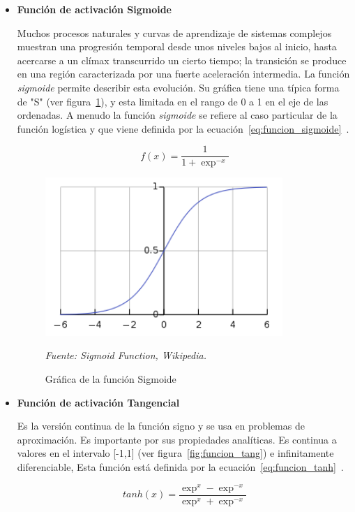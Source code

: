 \begin{itemize}
\item \textbf{Función de activación Sigmoide}

Muchos procesos naturales y curvas de aprendizaje de sistemas complejos muestran una progresión temporal desde unos niveles bajos al inicio, hasta acercarse a un clímax transcurrido un cierto tiempo; la transición se produce en una región caracterizada por una fuerte aceleración intermedia. La función \textit{sigmoide} permite describir esta evolución. Su gráfica tiene una típica forma de "S" (ver figura~\ref{fig:funcion_sigmoid}), y esta limitada en el rango de 0 a 1 en el eje de las ordenadas. A menudo la función \textit{sigmoide} se refiere al caso particular de la función logística y que viene definida por la ecuación~\ref{eq:funcion_sigmoide}~\cite{24fsigmoide}.

\begin{equation}\label{eq:funcion_sigmoide}
f(x) = \frac{1}{1+\exp^{-x}}
\end{equation}

\begin{figure}[H]
		\centering
		\includegraphics[width=90mm]{Imagenes/fSigmoid.png}
		\caption{Gráfica de la función Sigmoide}
		\vspace{0.15cm}
		\textit{Fuente: Sigmoid Function, Wikipedia.}
		\label{fig:funcion_sigmoid}
\end{figure} 

\item \textbf{Función de activación Tangencial}

Es la versión continua de la función signo y se usa en problemas de aproximación. Es importante por sus propiedades analíticas. Es continua a valores en el intervalo [-1,1] (ver figura~\ref{fig:funcion_tang}) e infinitamente diferenciable, Esta función está definida por la ecuación~\ref{eq:funcion_tanh}~\cite{25ftangencial}.

\begin{equation}\label{eq:funcion_tanh}
tanh(x) = \frac{\exp^x - \exp^{-x}}{\exp^x + \exp^{-x}}
\end{equation}


\end{itemize}
